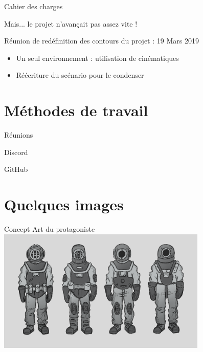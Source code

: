 \documentclass{beamer}
\begin{document}
\begin{frame}{Cahier des charges}

Mais... le projet n'avançait pas assez vite !

\pause
\bigskip
Réunion de redéfinition des contours du projet : 19 Mars 2019

\begin{itemize}
    \item Un seul environnement : utilisation de cinématiques
    \item Réécriture du scénario pour le condenser
\end{itemize}

\end{frame}

\section{Méthodes de travail}

\begin{frame}{Réunions}
  
\end{frame}

\begin{frame}{Discord}
  
\end{frame}

\begin{frame}{GitHub}
  
\end{frame}

\section{Quelques images}

\begin{frame}{Concept Art du protagoniste}
    \centering
    \includegraphics[width=10cm]{assets/CONCEPT_PROTAGONISTE}
\end{frame}
\end{document}
